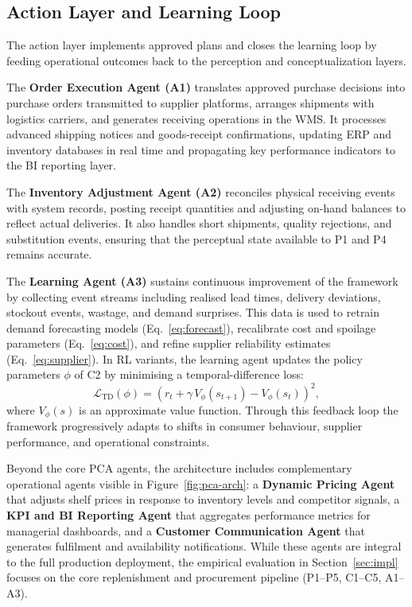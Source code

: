 \documentclass[utf8]{FrontiersinHarvard}
\begin{document}
	\subsection{Action Layer and Learning Loop}
	\label{sec:action}

	The action layer implements approved plans and closes the learning loop by
	feeding operational outcomes back to the perception and conceptualization
	layers.

	The \textbf{Order Execution Agent (A1)} translates approved purchase
	decisions into purchase orders transmitted to supplier platforms, arranges
	shipments with logistics carriers, and generates receiving operations in the
	WMS.  It processes advanced shipping notices and goods-receipt confirmations,
	updating ERP and inventory databases in real time and propagating key
	performance indicators to the BI reporting layer.

	The \textbf{Inventory Adjustment Agent (A2)} reconciles physical receiving
	events with system records, posting receipt quantities and adjusting
	on-hand balances to reflect actual deliveries.  It also handles short
	shipments, quality rejections, and substitution events, ensuring that the
	perceptual state available to P1 and P4 remains accurate.

	The \textbf{Learning Agent (A3)} sustains continuous improvement of the
	framework by collecting event streams including realised lead times,
	delivery deviations, stockout events, wastage, and demand surprises.  This
	data is used to retrain demand forecasting models
	(Eq.~\ref{eq:forecast}), recalibrate cost and spoilage parameters
	(Eq.~\ref{eq:cost}), and refine supplier reliability estimates
	(Eq.~\ref{eq:supplier}).  In RL variants, the learning agent updates the
	policy parameters $\phi$ of C2 by minimising a temporal-difference loss:
	\begin{equation}
		\label{eq:td}
		\mathcal{L}_{\text{TD}}(\phi) =
		\left(r_t + \gamma\,V_\phi(s_{t+1}) - V_\phi(s_t)\right)^2,
	\end{equation}
	where $V_\phi(s)$ is an approximate value function.  Through this feedback
	loop the framework progressively adapts to shifts in consumer behaviour,
	supplier performance, and operational constraints.

	Beyond the core PCA agents, the architecture includes complementary
	operational agents visible in Figure~\ref{fig:pca-arch}: a \textbf{Dynamic
	Pricing Agent} that adjusts shelf prices in response to inventory levels and
	competitor signals, a \textbf{KPI and BI Reporting Agent} that aggregates
	performance metrics for managerial dashboards, and a \textbf{Customer
	Communication Agent} that generates fulfilment and availability
	notifications.  While these agents are integral to the full production
	deployment, the empirical evaluation in Section~\ref{sec:impl} focuses on
	the core replenishment and procurement pipeline (P1--P5, C1--C5, A1--A3).
\end{document}
